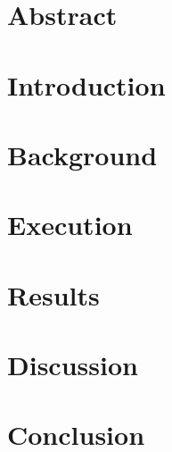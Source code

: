 \documentclass[12pt]{report}
\begin{document}


\tableofcontents

\chapter{Abstract}


\chapter{Introduction}


\chapter{Background}


\chapter{Execution}


\chapter{Results} \label{results}


\chapter{Discussion} \label{discussion}


\chapter{Conclusion}


\printbibliography
\end{document}
